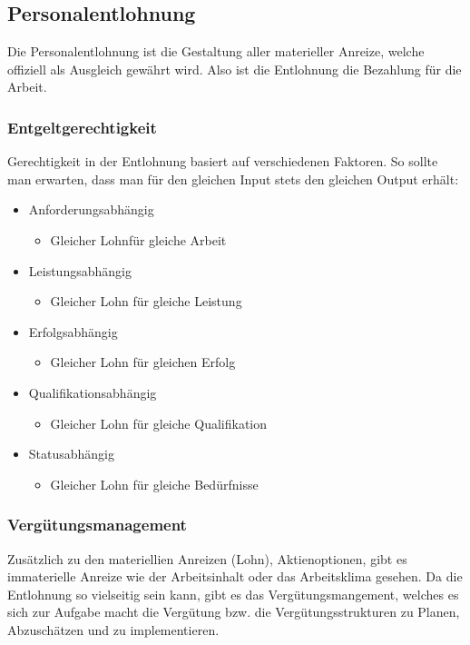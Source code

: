 \documentclass{article}
\begin{document}
	\subsection{Personalentlohnung}
	Die Personalentlohnung ist die Gestaltung aller materieller Anreize, welche offiziell als Ausgleich gewährt wird. Also ist die Entlohnung die Bezahlung für die Arbeit. 
	\subsubsection{Entgeltgerechtigkeit}
	Gerechtigkeit in der Entlohnung basiert auf verschiedenen Faktoren. So sollte man erwarten, dass man für den gleichen Input stets den gleichen Output erhält:
	\begin{itemize}
		\item{Anforderungsabhängig}
		\begin{itemize}
			\item{Gleicher Lohnfür gleiche Arbeit}
		\end{itemize}
		\item{Leistungsabhängig}
		\begin{itemize}
			\item{Gleicher Lohn für gleiche Leistung}
		\end{itemize}
		\item{Erfolgsabhängig}
		\begin{itemize}
			\item{Gleicher Lohn für gleichen Erfolg}
		\end{itemize}
		\item{Qualifikationsabhängig}
		\begin{itemize}
			\item{Gleicher Lohn für gleiche Qualifikation}
		\end{itemize}
		\item{Statusabhängig}
		\begin{itemize}
			\item{Gleicher Lohn für gleiche Bedürfnisse}
		\end{itemize}
	\end{itemize}
	\subsubsection{Vergütungsmanagement}
	Zusätzlich zu den materiellien Anreizen (Lohn), Aktienoptionen, gibt es immaterielle Anreize wie der Arbeitsinhalt oder das Arbeitsklima gesehen. Da die Entlohnung so vielseitig sein kann, gibt es das Vergütungsmangement, welches es sich zur Aufgabe macht die Vergütung bzw. die Vergütungsstrukturen zu Planen, Abzuschätzen und zu implementieren.
\end{document}
